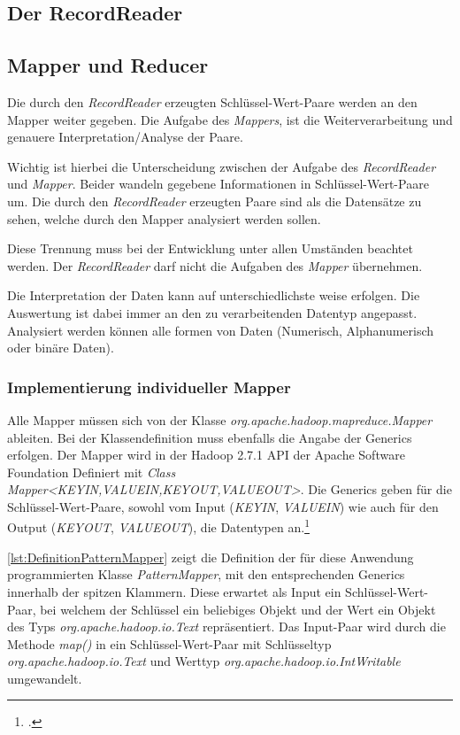 \subsection{Der RecordReader}\label{subsec:RecordReader}


\subsection{Mapper und Reducer}
Die durch den \textit{RecordReader} erzeugten Schlüssel-Wert-Paare werden an den Mapper weiter gegeben. Die Aufgabe des \textit{Mappers}, ist die Weiterverarbeitung und genauere Interpretation/Analyse der Paare.

Wichtig ist hierbei die Unterscheidung zwischen der Aufgabe des \textit{RecordReader} und \textit{Mapper}. Beider wandeln gegebene Informationen in Schlüssel-Wert-Paare um. Die durch den \textit{RecordReader} erzeugten Paare sind als die Datensätze zu sehen, welche durch den Mapper analysiert werden sollen.

Diese Trennung muss bei der Entwicklung unter allen Umständen beachtet werden. Der \textit{RecordReader} darf nicht die Aufgaben des \textit{Mapper} übernehmen.

Die Interpretation der Daten kann auf unterschiedlichste weise erfolgen. Die Auswertung ist dabei immer an den zu verarbeitenden Datentyp angepasst. Analysiert werden können alle formen von Daten (Numerisch, Alphanumerisch oder binäre Daten).

\subsubsection{Implementierung individueller Mapper}
Alle Mapper müssen sich von der Klasse \textit{org.apache.hadoop.mapreduce.Mapper} ableiten. Bei der Klassendefinition muss ebenfalls die Angabe der \glspl{Generic} erfolgen. Der Mapper wird in der Hadoop 2.7.1 \ac{API} der Apache Software Foundation Definiert mit \textit{Class Mapper<KEYIN,VALUEIN,KEYOUT,VALUEOUT>}. Die \glspl{Generic} geben für die Schlüssel-Wert-Paare, sowohl vom Input (\textit{KEYIN}, \textit{VALUEIN}) wie auch für den Output (\textit{KEYOUT}, \textit{VALUEOUT}), die Datentypen an.\footcite[Vgl.][]{ApacheHadoopApiDokuMapper.2015}

\autoref{lst:DefinitionPatternMapper} zeigt die Definition der für diese Anwendung programmierten Klasse \textit{PatternMapper}, mit den entsprechenden Generics innerhalb der spitzen Klammern. Diese erwartet als Input ein Schlüssel-Wert-Paar, bei welchem der Schlüssel ein beliebiges Objekt und der Wert ein Objekt des Typs \textit{org.apache.hadoop.io.Text} repräsentiert. Das Input-Paar wird durch die Methode \textit{map()} in ein Schlüssel-Wert-Paar mit Schlüsseltyp \textit{org.apache.hadoop.io.Text} und Werttyp \textit{org.apache.hadoop.io.IntWritable} umgewandelt. \\

